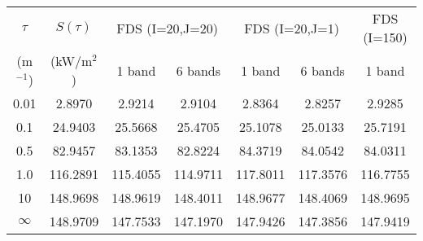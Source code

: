 \begin{center}
\begin{tabular}{|c|c|c|c|c|c|c|} \hline
$\tau$ & $S(\tau)$ & \multicolumn{2}{|c|}{FDS (I=20,J=20)} &
\multicolumn{2}{|c|}{FDS (I=20,J=1)} & FDS (I=150) \\ \cline{3-7}
(m$^{-1}$) & (kW/m$^2$)& 1 band    & 6 bands   & 1 band    & 6 bands  & 1 band \\ \hline\hline
     0.01 &    2.8970 &    2.9214 &    2.9104 &    2.8364 &    2.8257 &    2.9285 \\
      0.1 &   24.9403 &   25.5668 &   25.4705 &   25.1078 &   25.0133 &   25.7191 \\
      0.5 &   82.9457 &   83.1353 &   82.8224 &   84.3719 &   84.0542 &   84.0311 \\
      1.0 &  116.2891 &  115.4055 &  114.9711 &  117.8011 &  117.3576 &  116.7755 \\
       10 &  148.9698 &  148.9619 &  148.4011 &  148.9677 &  148.4069 &  148.9695 \\
 $\infty$ &  148.9709 &  147.7533 &  147.1970 &  147.9426 &  147.3856 &  147.9419 \\
\hline
\end{tabular}
\end{center}
